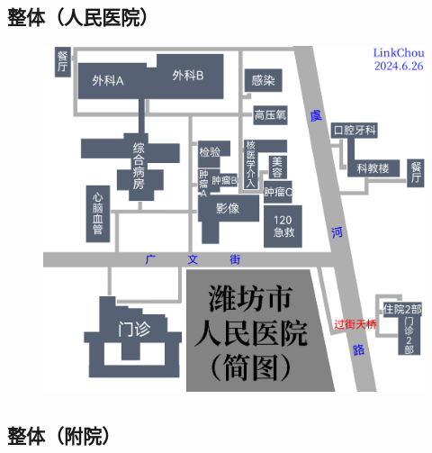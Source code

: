\subsection[整体（人民医院）]{整体（人民医院）}
\noindent\begin{figure}[H]
    \centering
    \vspace{8em}
    \noindent\includegraphics*[width=\linewidth]{resources/map/人民医院.pdf}
    \label{map_yuhe_renmin_hospital}
\end{figure}

\newpage
\subsection[整体（附院）]{整体（附院）}
\noindent\begin{figure}[H]
\end{figure}

\newpage